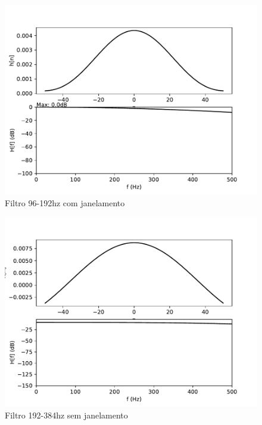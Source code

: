 \begin{figure}[H]
\begin{center}
            \includegraphics[scale=0.4]{fig/100/Hamming/windowfilter2.pdf}\\
            \small{Filtro 96-192hz com janelamento}
        \end{center}
    \endminipage
        \begin{center}
            \includegraphics[scale=0.4]{fig/100/Hamming/filter3.pdf}\\
            \small{Filtro 192-384hz sem janelamento}
    

\end{center}
\end{figure}
